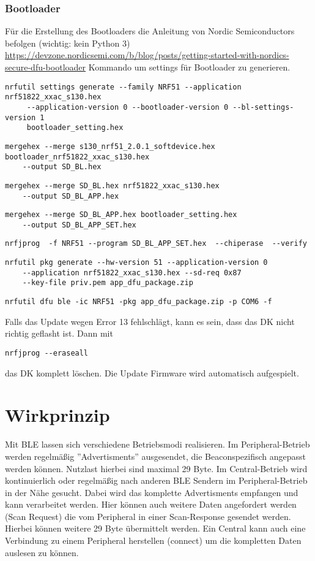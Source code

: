 \documentclass[11pt,ngerman]{scrartcl} %
\begin{document}
\subsubsection{Bootloader}
Für die Erstellung des Bootloaders die Anleitung von Nordic Semiconductors befolgen (wichtig: kein Python 3)
\url{https://devzone.nordicsemi.com/b/blog/posts/getting-started-with-nordics-secure-dfu-bootloader}
Kommando um settings für Bootloader zu generieren.
\begin{verbatim}
nrfutil settings generate --family NRF51 --application nrf51822_xxac_s130.hex 
     --application-version 0 --bootloader-version 0 --bl-settings-version 1
     bootloader_setting.hex
\end{verbatim}
\begin{verbatim}
mergehex --merge s130_nrf51_2.0.1_softdevice.hex bootloader_nrf51822_xxac_s130.hex 
	--output SD_BL.hex
\end{verbatim}
\begin{verbatim}
mergehex --merge SD_BL.hex nrf51822_xxac_s130.hex 
	--output SD_BL_APP.hex
\end{verbatim}
\begin{verbatim}
mergehex --merge SD_BL_APP.hex bootloader_setting.hex 
	--output SD_BL_APP_SET.hex
\end{verbatim}
\begin{verbatim}
nrfjprog  -f NRF51 --program SD_BL_APP_SET.hex  --chiperase  --verify
\end{verbatim}
\begin{verbatim}
nrfutil pkg generate --hw-version 51 --application-version 0 
	--application nrf51822_xxac_s130.hex --sd-req 0x87 
	--key-file priv.pem app_dfu_package.zip
\end{verbatim}
\begin{verbatim}
nrfutil dfu ble -ic NRF51 -pkg app_dfu_package.zip -p COM6 -f
\end{verbatim}
Falls das Update wegen Error 13 fehlschlägt, kann es sein, dass das DK nicht richtig geflasht ist. Dann mit 
\begin{verbatim}
nrfjprog --eraseall
\end{verbatim}
das DK komplett löschen. Die Update Firmware wird automatisch aufgespielt.
\section{Wirkprinzip}
Mit BLE lassen sich verschiedene Betriebsmodi realisieren. Im Peripheral-Betrieb werden regelmäßig ''Advertisments'' ausgesendet, die Beaconspezifisch angepasst werden können. Nutzlast hierbei sind maximal 29 Byte. Im Central-Betrieb wird kontinuierlich oder regelmäßig nach anderen BLE Sendern im Peripheral-Betrieb in der Nähe gesucht. Dabei wird das komplette Advertisments empfangen und kann verarbeitet werden. Hier können auch weitere Daten angefordert werden (Scan Request) die vom Peripheral in einer Scan-Response gesendet werden. Hierbei können weitere 29 Byte übermittelt werden. Ein Central kann auch eine Verbindung zu einem Peripheral herstellen  (connect) um die kompletten Daten auslesen zu können.
\end{document}
